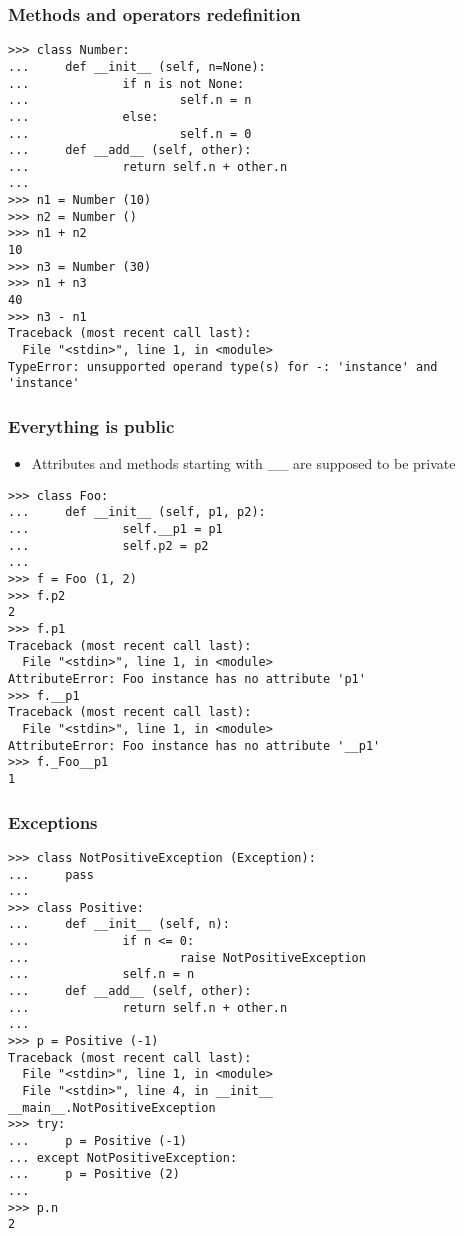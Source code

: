 \begin{frame}[fragile]
  \frametitle{Methods and operators redefinition}
{\scriptsize
\begin{verbatim}
>>> class Number:
...     def __init__ (self, n=None):
...             if n is not None:
...                     self.n = n
...             else:
...                     self.n = 0
...     def __add__ (self, other):
...             return self.n + other.n
... 
>>> n1 = Number (10)
>>> n2 = Number ()
>>> n1 + n2
10
>>> n3 = Number (30)
>>> n1 + n3
40
>>> n3 - n1
Traceback (most recent call last):
  File "<stdin>", line 1, in <module>
TypeError: unsupported operand type(s) for -: 'instance' and 'instance'
\end{verbatim}
}
\end{frame}

\begin{frame}[fragile]
  \frametitle{Everything is public}
  \begin{itemize}
  \item Attributes and methods starting with \_\_ are supposed to be
    private
  \end{itemize}
{\scriptsize
\begin{verbatim}
>>> class Foo:
...     def __init__ (self, p1, p2):
...             self.__p1 = p1
...             self.p2 = p2
... 
>>> f = Foo (1, 2)
>>> f.p2
2
>>> f.p1
Traceback (most recent call last):
  File "<stdin>", line 1, in <module>
AttributeError: Foo instance has no attribute 'p1'
>>> f.__p1
Traceback (most recent call last):
  File "<stdin>", line 1, in <module>
AttributeError: Foo instance has no attribute '__p1'
>>> f._Foo__p1
1
\end{verbatim}
}
\end{frame}

\begin{frame}[fragile]
  \frametitle{Exceptions}
{\scriptsize
\begin{verbatim}
>>> class NotPositiveException (Exception):
...     pass
... 
>>> class Positive:
...     def __init__ (self, n):
...             if n <= 0:
...                     raise NotPositiveException
...             self.n = n
...     def __add__ (self, other):
...             return self.n + other.n
...
>>> p = Positive (-1)
Traceback (most recent call last):
  File "<stdin>", line 1, in <module>
  File "<stdin>", line 4, in __init__
__main__.NotPositiveException
>>> try:
...     p = Positive (-1)
... except NotPositiveException:
...     p = Positive (2)
... 
>>> p.n
2
\end{verbatim}
}
\end{frame}

